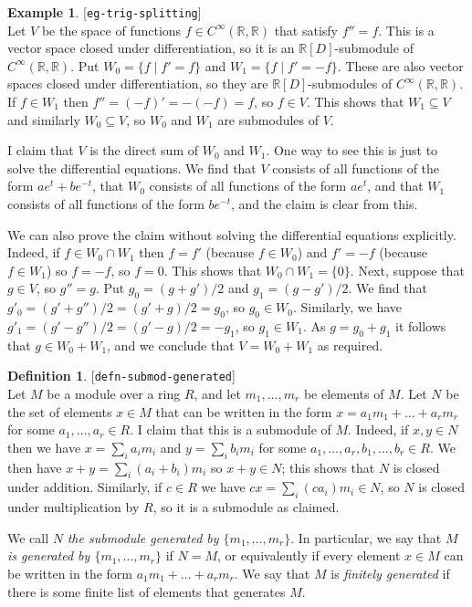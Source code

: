 \documentclass{amsart}
\newcommand{\lbl}[1]{\label{#1}\textup{[\texttt{#1}]}\ \\}
\newcommand{\lbl}{\label}
\newcommand{\R}         {{\mathbb{R}}}
\newcommand{\sse}       {\subseteq}
\newcommand{\CRR}       {C^\infty(\R,\R)}
\newcommand{\st}        {\;|\;}
\renewcommand{\:}{\colon}
\theoremstyle{definition}
\newtheorem{definition}[theorem]{Definition}
\newtheorem{example}[theorem]{Example}
\begin{document}
\begin{example}\lbl{eg-trig-splitting}
 Let $V$ be the space of functions $f\in\CRR$ that satisfy $f''=f$.
 This is a vector space closed under differentiation, so it is an
 $\R[D]$-submodule of $\CRR$.  Put $W_0=\{f\st f'=f\}$ and
 $W_1=\{f\st f'=-f\}$.  These are also vector spaces closed under
 differentiation, so they are $\R[D]$-submodules of $\CRR$.  If
 $f\in W_1$ then $f''=(-f)'=-(-f)=f$, so $f\in V$.  This shows that
 $W_1\sse V$ and similarly $W_0\sse V$, so $W_0$ and $W_1$ are
 submodules of $V$.  

 I claim that $V$ is the direct sum of $W_0$ and $W_1$.  One way to
 see this is just to solve the differential equations.  We find that
 $V$ consists of all functions of the form $ae^t+be^{-t}$, that $W_0$
 consists of all functions of the form $ae^t$, and that $W_1$
 consists of all functions of the form $be^{-t}$, and the claim is
 clear from this.

 We can also prove the claim without solving the differential
 equations explicitly.  Indeed, if $f\in W_0\cap W_1$ then $f=f'$
 (because $f\in W_0$) and $f'=-f$ (because $f\in W_1$) so $f=-f$, so
 $f=0$.  This shows that $W_0\cap W_1=\{0\}$.  Next, suppose that
 $g\in V$, so $g''=g$.  Put $g_0=(g+g')/2$ and $g_1=(g-g')/2$.  We
 find that $g'_0=(g'+g'')/2=(g'+g)/2=g_0$, so $g_0\in W_0$.
 Similarly, we have $g'_1=(g'-g'')/2=(g'-g)/2=-g_1$, so $g_1\in W_1$.
 As $g=g_0+g_1$ it follows that $g\in W_0+W_1$, and we conclude that
 $V=W_0+W_1$ as required.
\end{example}

\begin{definition}\lbl{defn-submod-generated}
 Let $M$ be a module over a ring $R$, and let $m_1,\ldots,m_r$ be
 elements of $M$.  Let $N$ be the set of elements $x\in M$ that can be
 written in the form $x=a_1m_1+\ldots+a_rm_r$ for some
 $a_1,\ldots,a_r\in R$.  I claim that this is a submodule of $M$.
 Indeed, if $x,y\in N$ then we have $x=\sum_ia_im_i$ and
 $y=\sum_ib_im_i$ for some $a_1,\ldots,a_r,b_1,\ldots,b_r\in R$.  We
 then have $x+y=\sum_i(a_i+b_i)m_i$ so $x+y\in N$; this shows that $N$
 is closed under addition.  Similarly, if $c\in R$ we have
 $cx=\sum_i(ca_i)m_i\in N$, so $N$ is closed under multiplication by
 $R$, so it is a submodule as claimed.

 We call $N$ \emph{the submodule generated by $\{m_1,\ldots,m_r\}$}.
 In particular, we say that \emph{$M$ is generated by
   $\{m_1,\ldots,m_r\}$ } if $N=M$, or equivalently if every element
 $x\in M$ can be written in the form $a_1m_1+\ldots+a_rm_r$.  We say
 that $M$ is \emph{finitely generated} if there is some finite list of
 elements that generates $M$.  
\end{definition}
\end{document}
